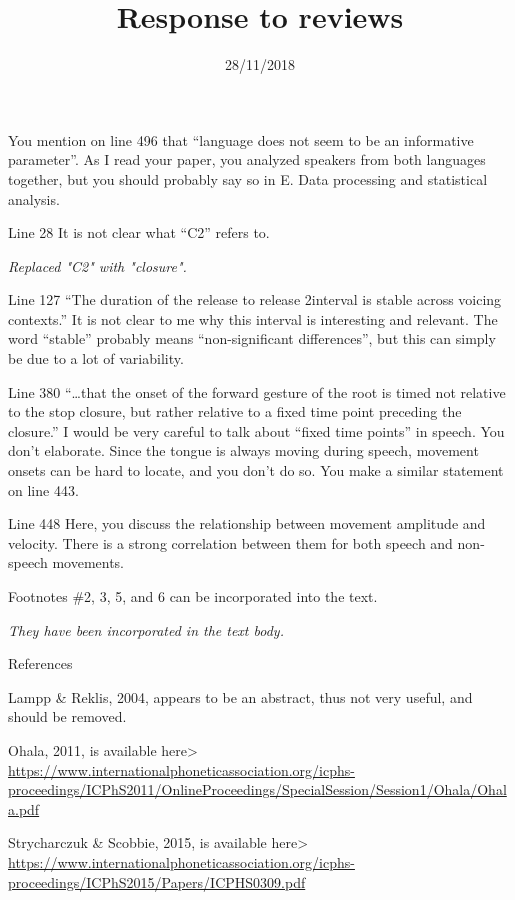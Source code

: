 \documentclass[]{article}
\title{Response to reviews}
\date{28/11/2018}
\begin{document}
\maketitle

You mention on line 496 that ``language does not seem to be an
informative parameter''. As I read your paper, you analyzed speakers
from both languages together, but you should probably say so in E. Data
processing and statistical analysis.

Line 28 It is not clear what ``C2'' refers to.

\begin{adjustwidth}{1cm}{} \textit{
Replaced "C2" with "closure".
} \end{adjustwidth}

Line 127 ``The duration of the release to release 2interval is stable
across voicing contexts.'' It is not clear to me why this interval is
interesting and relevant. The word ``stable'' probably means
``non-significant differences'', but this can simply be due to a lot of
variability.

Line 380 ``\ldots{}that the onset of the forward gesture of the root is
timed not relative to the stop closure, but rather relative to a fixed
time point preceding the closure.'' I would be very careful to talk
about ``fixed time points'' in speech. You don't elaborate. Since the
tongue is always moving during speech, movement onsets can be hard to
locate, and you don't do so. You make a similar statement on line 443.

Line 448 Here, you discuss the relationship between movement amplitude
and velocity. There is a strong correlation between them for both speech
and non-speech movements.

Footnotes \#2, 3, 5, and 6 can be incorporated into the text.

\begin{adjustwidth}{1cm}{} \textit{
They have been incorporated in the text body.
} \end{adjustwidth}

References

Lampp \& Reklis, 2004, appears to be an abstract, thus not very useful,
and should be removed.

Ohala, 2011, is available here\textgreater{}
\url{https://www.internationalphoneticassociation.org/icphs-proceedings/ICPhS2011/OnlineProceedings/SpecialSession/Session1/Ohala/Ohala.pdf}

Strycharczuk \& Scobbie, 2015, is available here\textgreater{}
\url{https://www.internationalphoneticassociation.org/icphs-proceedings/ICPhS2015/Papers/ICPHS0309.pdf}
\end{document}

